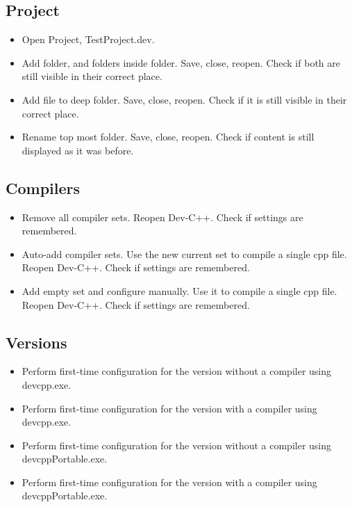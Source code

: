 \subsection{Project}
\begin{itemize}
    \item Open Project, TestProject.dev.
    \item Add folder, and folders inside folder. Save, close, reopen. Check if both are still visible in their correct place.
    \item Add file to deep folder.  Save, close, reopen. Check if it is still visible in their correct place.
    \item Rename top most folder. Save, close, reopen. Check if content is still displayed as it was before.
\end{itemize}

\subsection{Compilers}
\begin{itemize}
    \item Remove all compiler sets. Reopen Dev-C++. Check if settings are remembered.
    \item Auto-add compiler sets. Use the new current set to compile a single cpp file. Reopen Dev-C++. Check if settings are remembered.
    \item Add empty set and configure manually. Use it to compile a single cpp file. Reopen Dev-C++. Check if settings are remembered.
\end{itemize}

\subsection{Versions}
\begin{itemize}
    \item Perform first-time configuration for the version without a compiler using devcpp.exe.
    \item Perform first-time configuration for the version with a compiler using devcpp.exe.
    \item Perform first-time configuration for the version without a compiler using devcppPortable.exe.
    \item Perform first-time configuration for the version with a compiler using devcppPortable.exe.
\end{itemize}